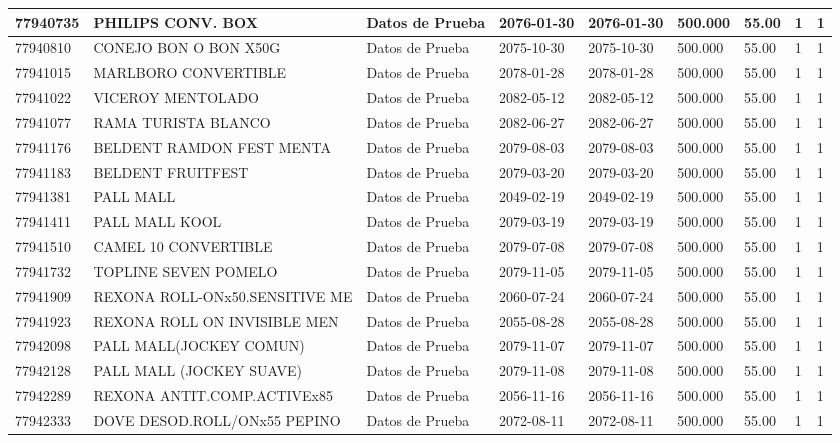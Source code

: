 \documentclass[a4paper,12pt]{article}
\begin{document}
\begin{landscape}
\begin{longtable}{|p{4cm}|p{2.5cm}|p{2.5cm}|p{1.8cm}|p{1.8cm}|p{1cm}|p{1cm}|p{3cm}|p{3cm}||}
77940735 & PHILIPS CONV. BOX & Datos de Prueba & 2076-01-30 & 2076-01-30 & 500.000 & 55.00 & 1 & 1 \\ \hline 
77940810 & CONEJO BON O BON X50G & Datos de Prueba & 2075-10-30 & 2075-10-30 & 500.000 & 55.00 & 1 & 1 \\ \hline 
77941015 & MARLBORO CONVERTIBLE & Datos de Prueba & 2078-01-28 & 2078-01-28 & 500.000 & 55.00 & 1 & 1 \\ \hline 
77941022 & VICEROY MENTOLADO & Datos de Prueba & 2082-05-12 & 2082-05-12 & 500.000 & 55.00 & 1 & 1 \\ \hline 
77941077 & RAMA TURISTA BLANCO & Datos de Prueba & 2082-06-27 & 2082-06-27 & 500.000 & 55.00 & 1 & 1 \\ \hline 
77941176 & BELDENT RAMDON FEST MENTA & Datos de Prueba & 2079-08-03 & 2079-08-03 & 500.000 & 55.00 & 1 & 1 \\ \hline 
77941183 & BELDENT FRUITFEST & Datos de Prueba & 2079-03-20 & 2079-03-20 & 500.000 & 55.00 & 1 & 1 \\ \hline 
77941381 & PALL MALL & Datos de Prueba & 2049-02-19 & 2049-02-19 & 500.000 & 55.00 & 1 & 1 \\ \hline 
77941411 & PALL MALL KOOL & Datos de Prueba & 2079-03-19 & 2079-03-19 & 500.000 & 55.00 & 1 & 1 \\ \hline 
77941510 & CAMEL 10 CONVERTIBLE & Datos de Prueba & 2079-07-08 & 2079-07-08 & 500.000 & 55.00 & 1 & 1 \\ \hline 
77941732 & TOPLINE SEVEN POMELO & Datos de Prueba & 2079-11-05 & 2079-11-05 & 500.000 & 55.00 & 1 & 1 \\ \hline 
77941909 & REXONA ROLL-ONx50.SENSITIVE ME & Datos de Prueba & 2060-07-24 & 2060-07-24 & 500.000 & 55.00 & 1 & 1 \\ \hline 
77941923 & REXONA ROLL ON INVISIBLE MEN & Datos de Prueba & 2055-08-28 & 2055-08-28 & 500.000 & 55.00 & 1 & 1 \\ \hline 
77942098 & PALL MALL(JOCKEY COMUN) & Datos de Prueba & 2079-11-07 & 2079-11-07 & 500.000 & 55.00 & 1 & 1 \\ \hline 
77942128 & PALL MALL (JOCKEY SUAVE) & Datos de Prueba & 2079-11-08 & 2079-11-08 & 500.000 & 55.00 & 1 & 1 \\ \hline 
77942289 & REXONA ANTIT.COMP.ACTIVEx85 & Datos de Prueba & 2056-11-16 & 2056-11-16 & 500.000 & 55.00 & 1 & 1 \\ \hline 
77942333 & DOVE DESOD.ROLL/ONx55 PEPINO & Datos de Prueba & 2072-08-11 & 2072-08-11 & 500.000 & 55.00 & 1 & 1 \\ \hline 

\end{longtable}
\end{landscape}
\end{document}
